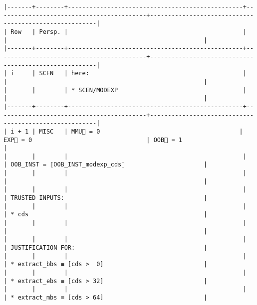 \documentclass[varwidth=\maxdimen,margin=0.5cm,multi={verbatim}]{standalone}
\begin{document}
\begin{verbatim}
|-------+--------+-------------------------------------------------+------------------------------------------+-------------------------------------------------------|
| Row   | Persp. |                                                 |                                          |                                                       |
|-------+--------+-------------------------------------------------+------------------------------------------+-------------------------------------------------------|
| i     | SCEN   | here:                                           |                                          |                                                       |
|       |        | * SCEN/MODEXP                                   |                                          |                                                       |
|-------+--------+-------------------------------------------------+------------------------------------------+-------------------------------------------------------|
| i + 1 | MISC   | MMU🏴 = 0                                       | EXP🏴 = 0                                | OOB🏴 = 1                                             |
|       |        |                                                 |                                          | OOB_INST = ⟦OOB_INST_modexp_cds⟧                      |
|       |        |                                                 |                                          |                                                       |
|       |        |                                                 |                                          | TRUSTED INPUTS:                                       |
|       |        |                                                 |                                          | * cds                                                 |
|       |        |                                                 |                                          |                                                       |
|       |        |                                                 |                                          | JUSTIFICATION FOR:                                    |
|       |        |                                                 |                                          | * extract_bbs ≡ [cds >  0]                            |
|       |        |                                                 |                                          | * extract_ebs ≡ [cds > 32]                            |
|       |        |                                                 |                                          | * extract_mbs ≡ [cds > 64]                            |

\end{verbatim}
\end{document}
